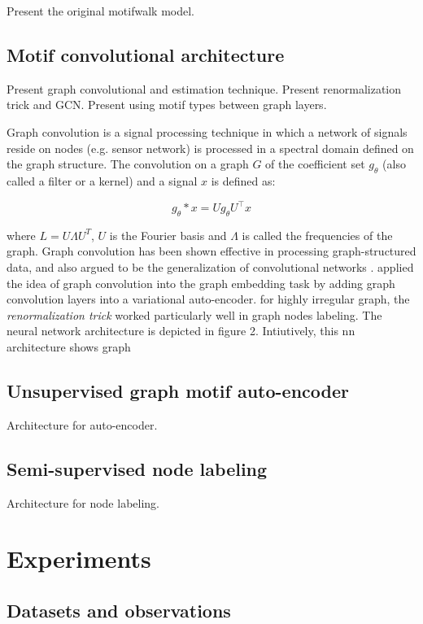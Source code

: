 \documentclass{article}
\theoremstyle{definition}
\begin{document}
Present the original motifwalk model.

\subsection{Motif convolutional architecture}

Present graph convolutional and estimation technique.
Present renormalization trick and GCN.
Present using motif types between graph layers.

Graph convolution is a signal processing technique in which
a network of signals reside on nodes (e.g. sensor network) is
processed in a spectral domain defined on the graph structure.
The convolution on a graph $G$ of the coefficient set $g_{\theta}$ 
(also called a filter or a kernel) and a signal $x$ is defined as:

$$ g_{\theta} \ast x = U g_{\theta} U^{\top} x$$

where $L = U \Lambda U^{T}$, $U$ is the Fourier basis
and $\Lambda$ is called the frequencies of the graph. 
Graph convolution has been shown effective in processing
graph-structured data, and also argued to be the generalization
of convolutional networks \cite{shuman2013emerging,defferrard2016convolutional,gcn}.
\citeauthor{kipf2016variational} applied the idea of graph convolution
into the graph embedding task by adding graph convolution layers into a
variational auto-encoder. 
for highly irregular graph, the \emph{renormalization
trick} worked particularly well in graph nodes labeling.
The neural network architecture is depicted in figure 2.
Intiutively, this nn architecture shows graph

\subsection{Unsupervised graph motif auto-encoder}

Architecture for auto-encoder.

\subsection{Semi-supervised node labeling}

Architecture for node labeling.

\section{Experiments}

\subsection{Datasets and observations}
\end{document}
